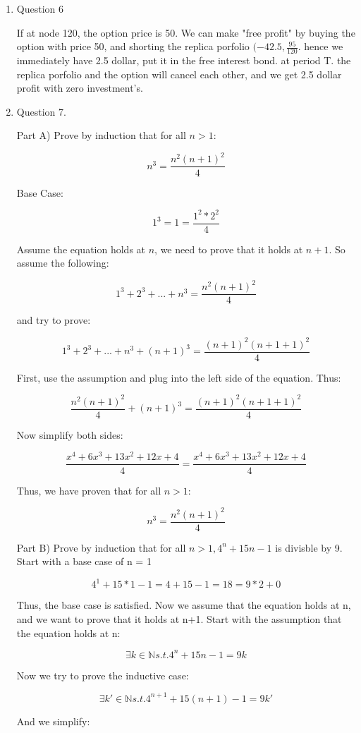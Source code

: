 \documentclass[]{book}
\theoremstyle{definition}
\begin{document}
\begin{enumerate}
\item Question 6

If at node 120, the option price is 50. We can make "free profit" by buying the option with price 50, and shorting the replica porfolio $(-42.5,\frac{95}{120}$. hence we immediately have 2.5 dollar, put it in the free interest bond. at period T. the replica porfolio and the option will cancel each other, and we get 2.5 dollar profit with zero investment’s.

\item Question 7.

Part A) Prove by induction that for all $n>1$:

$$n^3 = \frac{n^2(n+1)^2}{4}$$

Base Case:

$$1^3=1=\frac{1^2*2^2}{4}$$

Assume the equation holds at $n$, we need to prove that it holds at $n+1$. So assume the following:

$$1^3 + 2^3 + ... + n^3 = \frac{n^2(n+1)^2}{4}$$

and try to prove:

$$1^3 + 2^3 + ... + n^3 + (n+1)^3 = \frac{(n+1)^2(n+1+1)^2}{4}$$

First, use the assumption and plug into the left side of the equation. Thus:

$$\frac{n^2(n+1)^2}{4} + (n+1)^3 = \frac{(n+1)^2(n+1+1)^2}{4}$$

Now simplify both sides:

$$\frac{x^4+6x^3+13x^2+12x+4}{4}=\frac{x^4+6x^3+13x^2+12x+4}{4}$$

Thus, we have proven that for all $n>1$:

$$n^3 = \frac{n^2(n+1)^2}{4}$$


Part B) Prove by induction that for all $n>1, 4^n + 15n -1$ is divisble by 9. Start with a base case of n = 1

$$4^1 + 15 * 1 - 1 = 4 + 15 -1 = 18 = 9 * 2 + 0$$

Thus, the base case is satisfied. Now we assume that the equation holds at n, and we want to prove that it holds at n+1. Start with the assumption that the equation holds at n:

$$\exists k\in \mathbb{N} s.t.  4^n + 15n - 1 = 9k $$

Now we try to prove the inductive case:

$$\exists k'\in \mathbb{N} s.t.  4^{n+1} + 15(n+1) - 1 = 9k' $$

And we simplify:


\end{enumerate}
\end{document}
